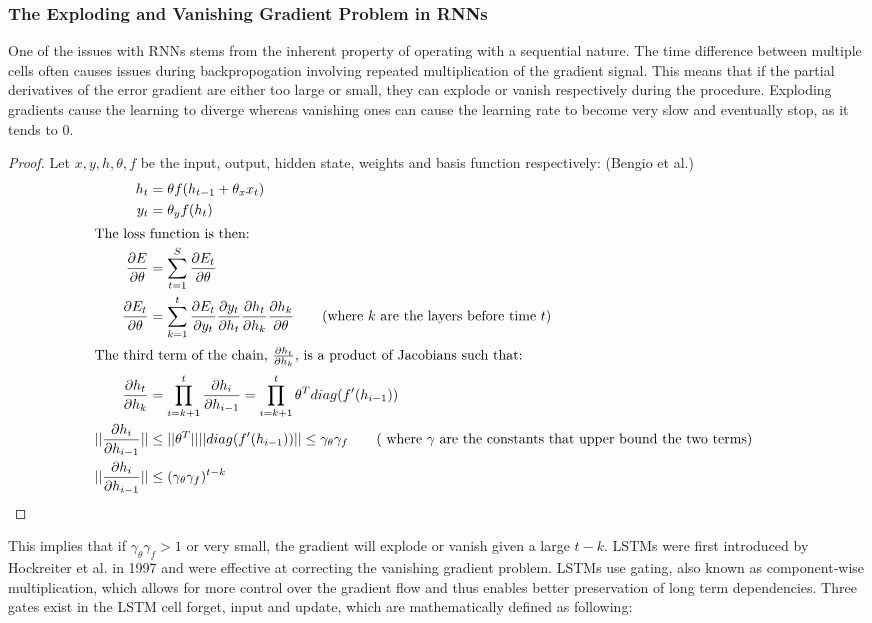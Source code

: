 \documentclass[10pt,onecolumn,letterpaper]{article}
\begin{document}
\subsubsection{The Exploding and Vanishing Gradient Problem in RNNs}

One of the issues with RNNs stems from the inherent property of operating with a sequential nature. The time difference between multiple cells often causes issues during backpropogation involving repeated multiplication of the gradient signal. This means that if the partial derivatives of the error gradient are either too large or small, they can explode or vanish respectively during the procedure. Exploding gradients cause the learning to diverge whereas vanishing ones can cause the learning rate to become very slow and eventually stop, as it tends to 0.
\vskip -1cm
\begin{proof}\renewcommand{\qedsymbol}{}
Let $x, y, h,  \theta, f $ be the input, output, hidden state, weights and basis function respectively: (Bengio et al.)
	\begin{align*}
    	h_{t} &=  \theta f(h_{t-1}+\theta_{x}x_{t})\\
    	y_{t} &= \theta_{y} f(h_{t}) \\
    	\shortintertext{The loss function is then:} 
    	\frac{\partial E}{\partial \theta} &= \sum_{t=1}^{S} \frac{\partial E_{t}}{\partial \theta} \\
  	\frac{\partial E_{t}}{\partial \theta} &= \sum_{k=1}^{t} \frac{\partial E_{t}}{\partial y_{t}} \frac{\partial  y_{t}}{\partial h_{t}} \frac{\partial h_{t}}{\partial h_{k}} \frac{\partial h_{k}}{\partial \theta} \tag{where $k$ are the layers before time $t$} \\
	\shortintertext{The third term of the chain, $\frac{\partial h_{t}}{\partial h_{k}}$, is a product of Jacobians such that:} 
	\frac{\partial h_{t}}{\partial h_{k}} &= \prod_{i = k+1}^{t} \frac{\partial h_{i}}{\partial h_{i-1}} = \prod_{i = k+1}^{t} \theta^{T}  diag(f'(h_{i-1})) \\
	||\frac{\partial h_{i}}{\partial h_{i-1}}|| & \leq ||\theta^{T}|| ||diag(f'(h_{i-1}))|| \leq \gamma_{\theta}\gamma_{f} \tag{ where $\gamma$ are the constants that upper bound the two terms} \\
	||\frac{\partial h_{i}}{\partial h_{i-1}}|| & \leq  (\gamma_{\theta}\gamma_{f})^{t-k} &&\qedhere \\
 	\end{align*}
\end{proof}
\vskip -0.5cm
This implies that if $\gamma_{\theta}\gamma_{f} > 1$ or very small, the gradient will explode or vanish given a large $t-k$. LSTMs were first introduced by Hockreiter et al.\cite{Hockreiter} in 1997 and were effective at correcting the vanishing gradient problem. LSTMs use gating, also known as component-wise multiplication, which allows for more control over the gradient flow and thus enables better preservation of long term dependencies. Three gates exist in the LSTM cell forget, input and update, which are mathematically defined as following: 
\end{document}
